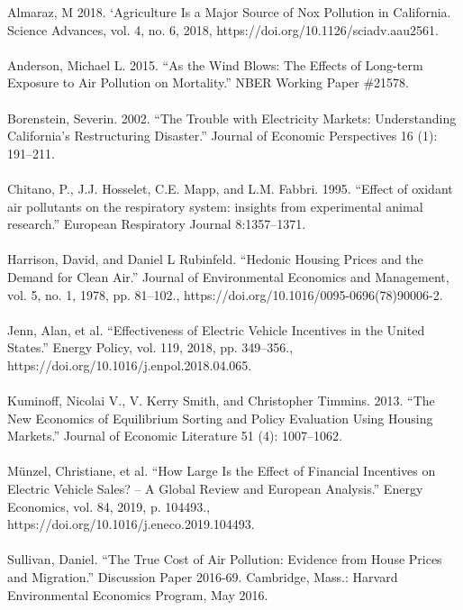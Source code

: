 \documentclass[12pt]{article}
\begin{document}
	Almaraz, M 2018. ‘Agriculture Is a Major Source of Nox Pollution in California. Science Advances, vol. 4, no. 6, 2018, https://doi.org/10.1126/sciadv.aau2561. \\\\
	Anderson, Michael L. 2015. “As the Wind Blows: The Effects of Long-term Exposure to Air Pollution on Mortality.” NBER Working Paper \#21578.\\\\
	Borenstein, Severin. 2002. “The Trouble with Electricity Markets: Understanding California’s Restructuring Disaster.” Journal of Economic Perspectives 16 (1): 191–211.\\\\
	Chitano, P., J.J. Hosselet, C.E. Mapp, and L.M. Fabbri. 1995. “Effect of oxidant air pollutants on the respiratory system: insights from experimental animal research.” European Respiratory Journal 8:1357–1371.\\\\
	Harrison, David, and Daniel L Rubinfeld. “Hedonic Housing Prices and the Demand for Clean Air.” Journal of Environmental Economics and Management, vol. 5, no. 1, 1978, pp. 81–102., https://doi.org/10.1016/0095-0696(78)90006-2. \\\\
	Jenn, Alan, et al. “Effectiveness of Electric Vehicle Incentives in the United States.” Energy Policy, vol. 119, 2018, pp. 349–356., https://doi.org/10.1016/j.enpol.2018.04.065. \\\\
	Kuminoff, Nicolai V., V. Kerry Smith, and Christopher Timmins. 2013. “The New Economics of Equilibrium Sorting and Policy Evaluation Using Housing Markets.” Journal of Economic Literature 51 (4): 1007–1062.\\\\
	Münzel, Christiane, et al. “How Large Is the Effect of Financial Incentives on Electric Vehicle Sales? – A Global Review and European Analysis.” Energy Economics, vol. 84, 2019, p. 104493., https://doi.org/10.1016/j.eneco.2019.104493. \\\\
	Sullivan, Daniel. “The True Cost of Air Pollution: Evidence from House Prices and Migration.” Discussion Paper 2016-69. Cambridge, Mass.: Harvard Environmental Economics Program, May 2016.
	
	
	
	
	
	
	
	
\end{document}
